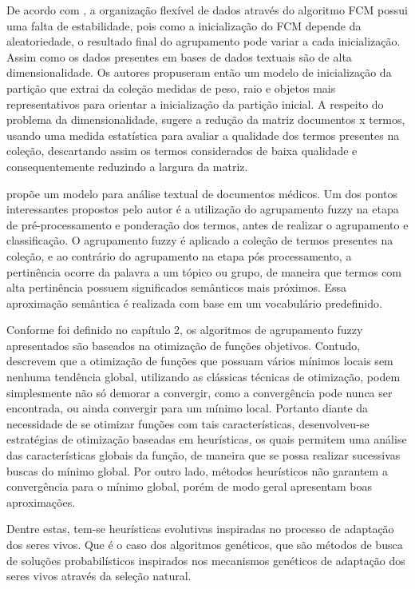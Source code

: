 De acordo com , a organização flexível de dados através do algoritmo FCM possui
uma falta de estabilidade, pois como a inicialização do FCM depende da aleatoriedade, o resultado
final do agrupamento pode variar a cada inicialização. Assim como os dados presentes em bases de
dados textuais são de alta dimensionalidade.  Os autores propuseram então um modelo de inicialização
da partição que extrai da coleção medidas de peso, raio e objetos mais representativos para orientar
a inicialização da partição inicial. A respeito do problema da dimensionalidade, 
sugere a redução da matriz documentos x termos, usando uma medida estatística para avaliar a
qualidade dos termos presentes na coleção, descartando assim os termos considerados de baixa
qualidade e consequentemente reduzindo a largura da matriz.

 propõe um modelo para análise textual de documentos médicos. Um dos pontos
interessantes propostos pelo autor é a utilização do agrupamento fuzzy na etapa de
pré-processamento e ponderação dos termos, antes de realizar o agrupamento e classificação. 
O agrupamento fuzzy é aplicado a coleção de termos presentes na coleção, e ao contrário do
agrupamento na etapa pós processamento, a pertinência ocorre da palavra a um tópico ou grupo, 
de maneira que termos com alta pertinência possuem significados
semânticos mais próximos. Essa aproximação semântica é realizada com base em um vocabulário
predefinido.

Conforme foi definido no capítulo 2, os algoritmos de agrupamento fuzzy apresentados são baseados na
otimização de funções objetivos. Contudo,  descrevem que a otimização de 
funções que possuam vários mínimos locais
sem nenhuma tendência global, utilizando as clássicas técnicas de otimização, podem simplesmente
não só demorar a convergir, como a convergência pode nunca ser encontrada, ou ainda convergir para
um mínimo local. Portanto diante da necessidade de se otimizar funções com
tais características, desenvolveu-se estratégias de otimização baseadas em heurísticas, os quais
permitem uma análise das características globais da função, de maneira que se possa realizar
sucessivas buscas do mínimo global. Por outro lado, métodos heurísticos não garantem a convergência para
o mínimo global, porém de modo geral apresentam boas aproximações. 

Dentre estas, tem-se heurísticas
evolutivas
inspiradas no processo de adaptação dos seres vivos. Que é o caso dos algoritmos
genéticos, que são métodos de busca de soluções probabilísticos inspirados nos mecanismos 
genéticos de adaptação dos seres vivos através da seleção natural. 


